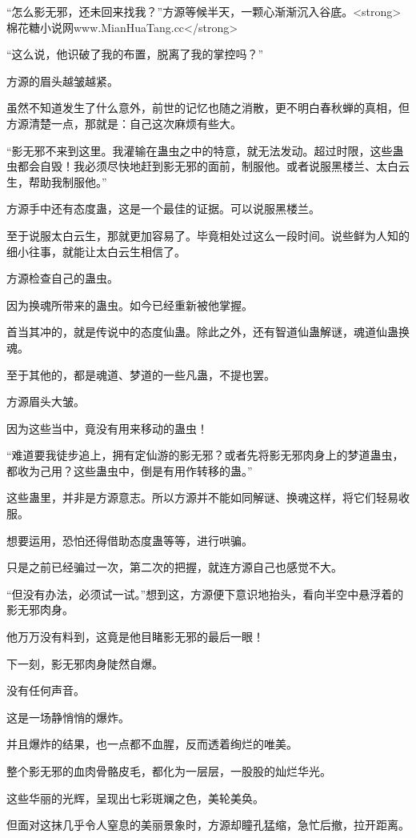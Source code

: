 \begin{this_body}
“怎么影无邪，还未回来找我？”方源等候半天，一颗心渐渐沉入谷底。<strong>棉花糖小说网www.MianHuaTang.cc</strong>

“这么说，他识破了我的布置，脱离了我的掌控吗？”

方源的眉头越皱越紧。

虽然不知道发生了什么意外，前世的记忆也随之消散，更不明白春秋蝉的真相，但方源清楚一点，那就是：自己这次麻烦有些大。

“影无邪不来到这里。我灌输在蛊虫之中的特意，就无法发动。超过时限，这些蛊虫都会自毁！我必须尽快地赶到影无邪的面前，制服他。或者说服黑楼兰、太白云生，帮助我制服他。”

方源手中还有态度蛊，这是一个最佳的证据。可以说服黑楼兰。

至于说服太白云生，那就更加容易了。毕竟相处过这么一段时间。说些鲜为人知的细小往事，就能让太白云生相信了。

方源检查自己的蛊虫。

因为换魂所带来的蛊虫。如今已经重新被他掌握。

首当其冲的，就是传说中的态度仙蛊。除此之外，还有智道仙蛊解谜，魂道仙蛊换魂。

至于其他的，都是魂道、梦道的一些凡蛊，不提也罢。

方源眉头大皱。

因为这些当中，竟没有用来移动的蛊虫！

“难道要我徒步追上，拥有定仙游的影无邪？或者先将影无邪肉身上的梦道蛊虫，都收为己用？这些蛊虫中，倒是有用作转移的蛊。”

这些蛊里，并非是方源意志。所以方源并不能如同解谜、换魂这样，将它们轻易收服。

想要运用，恐怕还得借助态度蛊等等，进行哄骗。

只是之前已经骗过一次，第二次的把握，就连方源自己也感觉不大。

“但没有办法，必须试一试。”想到这，方源便下意识地抬头，看向半空中悬浮着的影无邪肉身。

他万万没有料到，这竟是他目睹影无邪的最后一眼！

下一刻，影无邪肉身陡然自爆。

没有任何声音。

这是一场静悄悄的爆炸。

并且爆炸的结果，也一点都不血腥，反而透着绚烂的唯美。

整个影无邪的血肉骨骼皮毛，都化为一层层，一股股的灿烂华光。

这些华丽的光辉，呈现出七彩斑斓之色，美轮美奂。

但面对这抹几乎令人窒息的美丽景象时，方源却瞳孔猛缩，急忙后撤，拉开距离。


\end{this_body}
